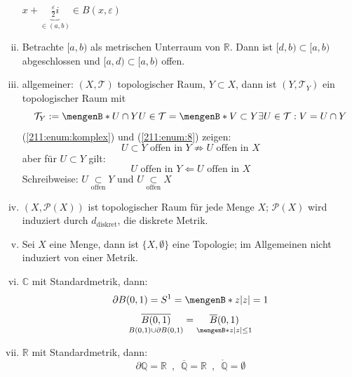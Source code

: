 \begin{enumerate}[(i)]
	\begin{figure}[ht]
	\end{figure}
	$x + \underbrace{\frac{\varepsilon}{2} i}_{\in (a,b)} \in B(x, \varepsilon) $
	\item \label{211:enum:8} Betrachte $[a,b)$ als metrischen Unterraum von $\mathds{R}$. Dann ist $[d,b) \subset [a,b)$ abgeschlossen und $[a,d) \subset [a,b)$ offen.
	\item allgemeiner: $(X,\mathcal{T})$ topologischer Raum, $Y \subset X$, dann ist $(Y, \mathcal{T}_Y)$ ein topologischer Raum mit 
	\[
		\mathcal{T}_Y := \set[U \cap Y]{U \in \mathcal{T}} = \set[V \subset Y]{\exists U \in \mathcal{T} : V = U  \cap Y} 
	\]
	(\ref{211:enum:komplex}) und (\ref{211:enum:8}) zeigen:
	\[
		U \subset Y \text{ offen in }Y \not\Rightarrow U \text{ offen in } X
	\]
	aber für $U \subset Y$ gilt: 
	\[
		U \text{ offen in } Y \Leftarrow U \text{ offen in } X
	\]
	Schreibweise: $U \underset{\text{offen}}{\subset} Y$ und $U \underset{\text{offen}}{\subset} X$
	\item $(X, \mathcal{P}(X))$ ist topologischer Raum für jede Menge $X$; $\mathcal{P}(X)$ wird induziert durch $d_{\text{diskret}}$, die diskrete Metrik.
	\item Sei $X$ eine Menge, dann ist $\{X, \emptyset \}$ eine Topologie; im Allgemeinen nicht induziert von einer Metrik.
	\item $\mathds{C}$ mit Standardmetrik, dann:
	\[
		\partial B(0,1) = S^1 = \set[z]{\abs{z}=1} 
	\]
	\[
		\underset{B(0,1) \cup \partial B(0,1)}{\overline{B(0,1)}} = \underset{ \set[z]{\abs{z}  \le 1 } }{\overline{B}(0,1)}
	\]
	\item $\mathds{R}$ mit Standardmetrik, dann:
	\[
		\partial \mathds{Q} = \mathds{R} \enspace, \enspace \overline{\mathds{Q}} = \mathds{R} \enspace, \enspace \mathring{\mathds{Q}}= \emptyset 
	\]
\end{enumerate}

